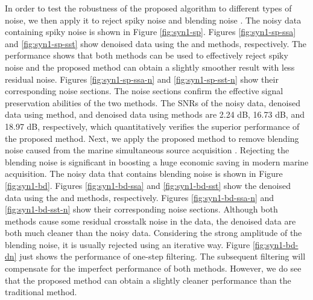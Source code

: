 In order to test the robustness of the proposed algorithm to different types of noise, we then apply it to reject spiky noise and blending noise \cite[]{yangkang20142}. The noisy data containing spiky noise is shown in Figure \ref{fig:syn1-sp}. Figures \ref{fig:syn1-sp-ssa} and \ref{fig:syn1-sp-sst} show denoised data using the  and  methods, respectively. The performance shows that both methods can be used to effectively reject spiky noise and the proposed  method can obtain a slightly smoother result with less residual noise. Figures \ref{fig:syn1-sp-ssa-n} and \ref{fig:syn1-sp-sst-n} show their corresponding noise sections. The noise sections confirm the effective signal preservation abilities of the two methods. The SNRs of the noisy data, denoised data using  method, and denoised data using  methods are 2.24 dB, 16.73 dB, and 18.97 dB, respectively, which quantitatively verifies the superior performance of the proposed  method. Next, we apply the proposed method to remove blending noise caused from the marine simultaneous source acquisition \cite[]{berkhout2008}. Rejecting the blending noise is significant in boosting a huge economic saving in modern marine acquisition. The noisy data that contains blending noise is shown in Figure \ref{fig:syn1-bd}. Figures \ref{fig:syn1-bd-ssa} and \ref{fig:syn1-bd-sst} show the denoised data using the  and  methods, respectively. Figures \ref{fig:syn1-bd-ssa-n} and \ref{fig:syn1-bd-sst-n} show their corresponding noise sections. Although both methods cause some residual crosstalk noise in the data, the denoised data are both much cleaner than the noisy data. Considering the strong amplitude of the blending noise, it is usually rejected using an iterative way. Figure \ref{fig:syn1-bd-dn} just shows the performance of one-step filtering. The subsequent filtering will compensate for the imperfect performance of both methods. However, we do see that the proposed method can obtain a slightly cleaner performance than the traditional  method. 

